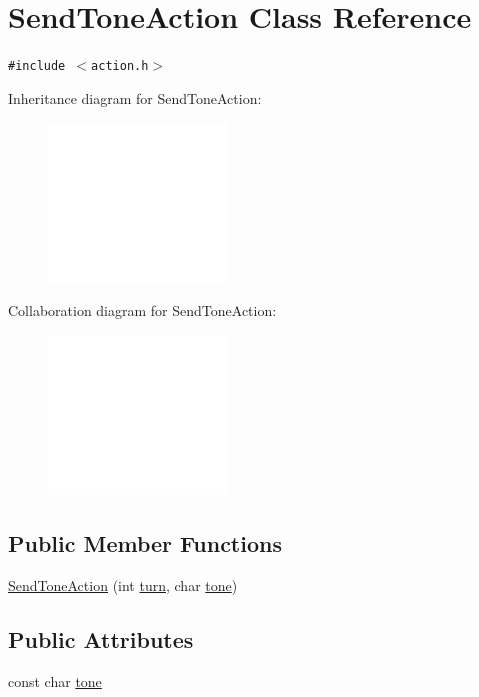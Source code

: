\hypertarget{classSendToneAction}{
\section{SendToneAction Class Reference}
\label{classSendToneAction}
}
{\tt \#include $<$action.h$>$}

Inheritance diagram for SendToneAction:\nopagebreak
\begin{figure}[H]
\begin{center}
\leavevmode
\includegraphics[width=134pt]{classSendToneAction__inherit__graph}
\end{center}
\end{figure}
Collaboration diagram for SendToneAction:\nopagebreak
\begin{figure}[H]
\begin{center}
\leavevmode
\includegraphics[width=134pt]{classSendToneAction__coll__graph}
\end{center}
\end{figure}
\subsection*{Public Member Functions}
\begin{CompactItemize}
\item 
\hyperlink{classSendToneAction_462b5171c72469683ab2d94e678cb955}{SendToneAction} (int \hyperlink{classAction_51e5d56a6aa4a037e90df19587a225c7}{turn}, char \hyperlink{classSendToneAction_971b5f50b925ee5e3ace27c909c0c3f9}{tone})
\end{CompactItemize}
\subsection*{Public Attributes}
\begin{CompactItemize}
\item 
const char \hyperlink{classSendToneAction_971b5f50b925ee5e3ace27c909c0c3f9}{tone}
\end{CompactItemize}


